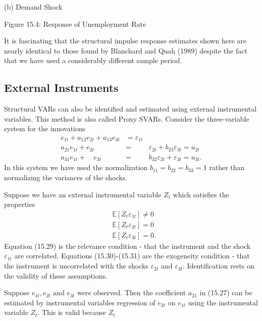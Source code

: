 \documentclass[10pt]{article}
\begin{document}
(b) Demand Shock

Figure 15.4: Response of Unemployment Rate

It is fascinating that the structural impulse response estimates shown here are nearly identical to those found by Blanchard and Quah (1989) despite the fact that we have used a considerably different sample period.

\subsection{External Instruments}
Structural VARs can also be identified and estimated using external instrumental variables. This method is also called Proxy SVARs. Consider the three-variable system for the innovations
$$
\begin{array}{rrr}
e_{1 t}+a_{12} e_{2 t}+a_{13} e_{3 t} & =\varepsilon_{1 t} \\
a_{21} e_{1 t}+e_{2 t} & = & \varepsilon_{2 t}+b_{23} \varepsilon_{3 t}=u_{2 t} \\
a_{31} e_{1 t}+\quad e_{3 t} & = & b_{32} \varepsilon_{2 t}+\varepsilon_{3 t}=u_{3 t} .
\end{array}
$$
In this system we have used the normalization $b_{11}=b_{22}=b_{33}=1$ rather than normalizing the variances of the shocks.

Suppose we have an external instrumental variable $Z_{t}$ which satisfies the properties
$$
\begin{aligned}
&\mathbb{E}\left[Z_{t} \varepsilon_{1 t}\right] \neq 0 \\
&\mathbb{E}\left[Z_{t} \varepsilon_{2 t}\right]=0 \\
&\mathbb{E}\left[Z_{t} \varepsilon_{3 t}\right]=0 .
\end{aligned}
$$
Equation (15.29) is the relevance condition - that the instrument and the shock $\varepsilon_{1 t}$ are correlated. Equations (15.30)-(15.31) are the exogeneity condition - that the instrument is uncorrelated with the shocks $\varepsilon_{2 t}$ and $\varepsilon_{3 t}$. Identification rests on the validity of these assumptions.

Suppose $e_{1 t}, e_{2 t}$ and $e_{3 t}$ were observed. Then the coefficient $a_{21}$ in (15.27) can be estimated by instrumental variables regression of $e_{2 t}$ on $e_{1 t}$ using the instrumental variable $Z_{t}$. This is valid because $Z_{t}$
\end{document}

